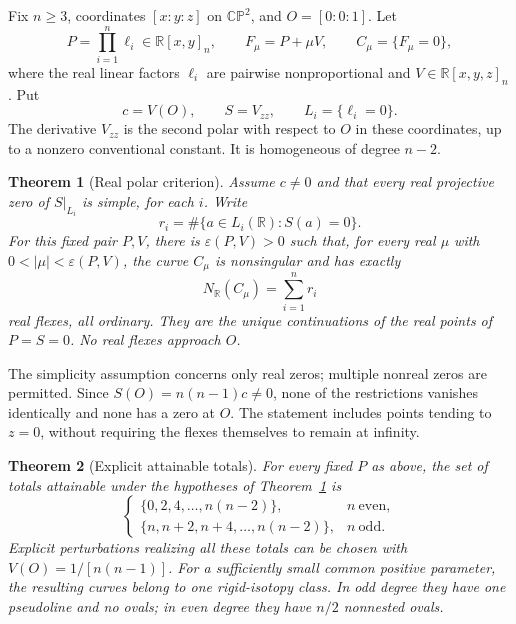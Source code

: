 \documentclass[11pt,a4paper]{article}
\newtheorem{theorem}{Theorem}[section]
\theoremstyle{remark}
\newcommand{\R}{\mathbb R}
\newcommand{\CP}{\mathbb {CP}}
\begin{document}
Fix \(n\geq3\), coordinates \([x:y:z]\) on \(\CP^2\), and
\(O=[0:0:1]\). Let
\begin{equation}\label{eq:family}
 P=\prod_{i=1}^n\ell_i\in\R[x,y]_n,\qquad
 F_\mu=P+\mu V,\qquad C_\mu=\{F_\mu=0\},
\end{equation}
where the real linear factors \(\ell_i\) are pairwise nonproportional
and \(V\in\R[x,y,z]_n\). Put
\begin{equation}\label{eq:polar}
 c=V(O),\qquad S=V_{zz},\qquad L_i=\{\ell_i=0\}.
\end{equation}
The derivative \(V_{zz}\) is the second polar with respect to \(O\)
in these coordinates, up to a nonzero conventional constant.
It is homogeneous of degree \(n-2\).

\begin{theorem}[Real polar criterion]\label{thm:polar}
Assume \(c\ne0\) and that every real projective zero of \(S|_{L_i}\)
is simple, for each \(i\). Write
\[
 r_i=\#\{a\in L_i(\R):S(a)=0\}.
\]
For this fixed pair \(P,V\), there is \(\varepsilon(P,V)>0\) such
that, for every real \(\mu\) with \(0<|\mu|<\varepsilon(P,V)\),
the curve \(C_\mu\) is nonsingular and has exactly
\begin{equation}\label{eq:realcount}
                         N_{\R}(C_\mu)=\sum_{i=1}^n r_i
\end{equation}
real flexes, all ordinary. They are the unique continuations of the
real points of \(P=S=0\). No real flexes approach \(O\).
\end{theorem}

The simplicity assumption concerns only real zeros; multiple nonreal
zeros are permitted. Since \(S(O)=n(n-1)c\ne0\), none of the
restrictions vanishes identically and none has a zero at \(O\).
The statement includes points tending to \(z=0\), without requiring
the flexes themselves to remain at infinity.

\begin{theorem}[Explicit attainable totals]\label{thm:construction}
For every fixed \(P\) as above, the set of totals attainable under
the hypotheses of Theorem~\ref{thm:polar} is
\begin{equation}\label{eq:spectrum}
 \begin{cases}
 \{0,2,4,\ldots,n(n-2)\},& n\ \text{even},\\
 \{n,n+2,n+4,\ldots,n(n-2)\},& n\ \text{odd}.
 \end{cases}
\end{equation}
Explicit perturbations realizing all these totals can be chosen with
\(V(O)=1/[n(n-1)]\). For a sufficiently small common positive
parameter, the resulting curves belong to one rigid-isotopy class.
In odd degree they have one pseudoline and no ovals; in even degree
they have \(n/2\) nonnested ovals.
\end{theorem}
\end{document}
